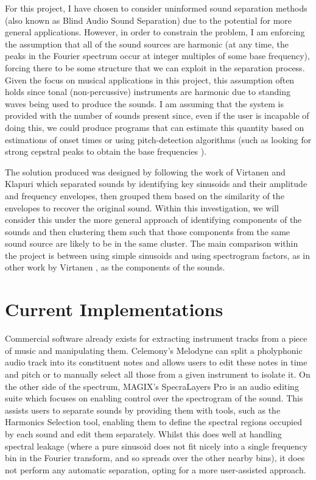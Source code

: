 \documentclass[10pt,twoside,a4paper]{report}
\begin{document}
For this project, I have chosen to consider uninformed sound separation methods (also known as Blind Audio Sound Separation) due to the potential for more general applications. However, in order to constrain the problem, I am enforcing the assumption that all of the sound sources are harmonic (at any time, the peaks in the Fourier spectrum occur at integer multiples of some base frequency), forcing there to be some structure that we can exploit in the separation process. Given the focus on musical applications in this project, this assumption often holds since tonal (non-percussive) instruments are harmonic due to standing waves being used to produce the sounds. I am assuming that the system is provided with the number of sounds present since, even if the user is incapable of doing this, we could produce programs that can estimate this quantity based on estimations of onset times or using pitch-detection algorithms (such as looking for strong cepstral peaks to obtain the base frequencies \cite{noll1967cepstrum}).

The solution produced was designed by following the work of Virtanen and Klapuri \cite{virtanen2000separation} which separated sounds by identifying key sinusoids and their amplitude and frequency envelopes, then grouped them based on the similarity of the envelopes to recover the original sound. Within this investigation, we will consider this under the more general approach of identifying components of the sounds and then clustering them such that those components from the same sound source are likely to be in the same cluster. The main comparison within the project is between using simple sinusoids and using spectrogram factors, as in other work by Virtanen \cite{virtanen2003sound}, as the components of the sounds.

\section{Current Implementations}

Commercial software already exists for extracting instrument tracks from a piece of music and manipulating them. Celemony's Melodyne \cite{melodyne} can split a pholyphonic audio track into its constituent notes and allows users to edit these notes in time and pitch or to manually select all those from a given instrument to isolate it. On the other side of the spectrum, MAGIX's SpecraLayers Pro \cite{spatralayers} is an audio editing suite which focuses on enabling control over the spectrogram of the sound. This assists users to separate sounds by providing them with tools, such as the Harmonics Selection tool, enabling them to define the spectral regions occupied by each sound and edit them separately. Whilst this does well at handling spectral leakage (where a pure sinusoid does not fit nicely into a single frequency bin in the Fourier transform, and so spreads over the other nearby bins), it does not perform any automatic separation, opting for a more user-assisted approach.
\end{document}
